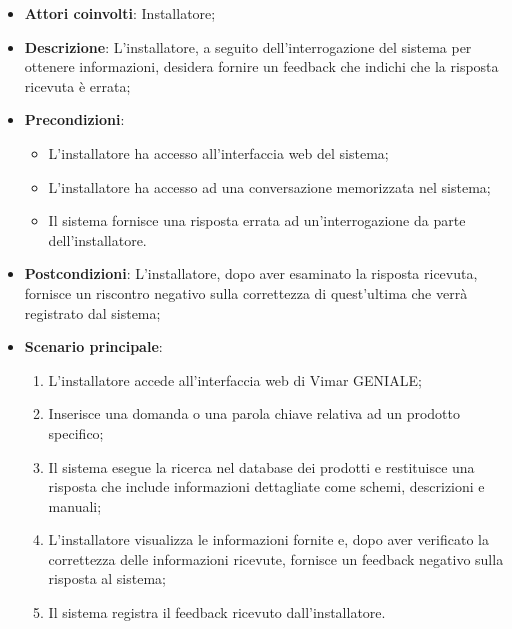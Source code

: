 \begin{itemize}
    \item \textbf{Attori coinvolti}: Installatore;
    \item \textbf{Descrizione}: L’installatore, a seguito dell’interrogazione del sistema per ottenere informazioni, desidera fornire un feedback che indichi che la risposta ricevuta è errata;
    \item \textbf{Precondizioni}: 
        \begin{itemize}
            \item L’installatore ha accesso all’interfaccia web del sistema;
            \item L’installatore ha accesso ad una conversazione memorizzata nel sistema;
            \item Il sistema fornisce una risposta errata ad un’interrogazione da parte dell’installatore.
        \end{itemize}
    \item \textbf{Postcondizioni}: L’installatore, dopo aver esaminato la risposta ricevuta, fornisce un riscontro negativo sulla correttezza di quest’ultima che verrà registrato dal sistema;
    \item \textbf{Scenario principale}:
    \begin{enumerate}
    \item L’installatore accede all’interfaccia web di Vimar GENIALE;
    \item Inserisce una domanda o una parola chiave relativa ad un prodotto specifico;
    \item Il sistema esegue la ricerca nel database dei prodotti e restituisce una risposta che include informazioni dettagliate come schemi, descrizioni e manuali;
    \item L’installatore visualizza le informazioni fornite e, dopo aver verificato la correttezza delle informazioni ricevute, fornisce un feedback negativo sulla risposta al sistema;
    \item Il sistema registra il feedback ricevuto dall’installatore.
    \end{enumerate}
\end{itemize}

